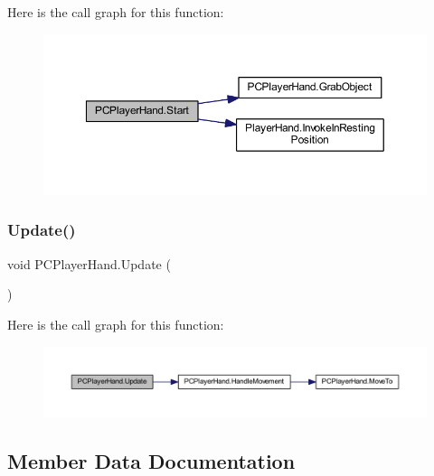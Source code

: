 Here is the call graph for this function\+:
\nopagebreak
\begin{figure}[H]
\begin{center}
\leavevmode
\includegraphics[width=350pt]{class_p_c_player_hand_aa3eed40e80c66f9e85905cf2c2c4fcbe_cgraph}
\end{center}
\end{figure}
\mbox{\label{class_p_c_player_hand_a1fec11a83fbd674a2a0ff6790704a847}} 
\subsubsection{\texorpdfstring{Update()}{Update()}}
{\footnotesize\ttfamily void P\+C\+Player\+Hand.\+Update (\begin{DoxyParamCaption}{ }\end{DoxyParamCaption})\hspace{0.3cm}{\ttfamily [private]}}

Here is the call graph for this function\+:
\nopagebreak
\begin{figure}[H]
\begin{center}
\leavevmode
\includegraphics[width=350pt]{class_p_c_player_hand_a1fec11a83fbd674a2a0ff6790704a847_cgraph}
\end{center}
\end{figure}


\subsection{Member Data Documentation}
\mbox{\label{class_p_c_player_hand_a25ff91db9893158f5185b4826d563e60}} 
